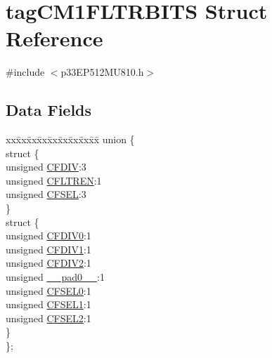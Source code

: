 \hypertarget{structtag_c_m1_f_l_t_r_b_i_t_s}{}\section{tag\+C\+M1\+F\+L\+T\+R\+B\+I\+TS Struct Reference}
\label{structtag_c_m1_f_l_t_r_b_i_t_s}


{\ttfamily \#include $<$p33\+E\+P512\+M\+U810.\+h$>$}

\subsection*{Data Fields}
\begin{DoxyCompactItemize}
\item 
\begin{tabbing}
xx\=xx\=xx\=xx\=xx\=xx\=xx\=xx\=xx\=\kill
union \{\\
\>struct \{\\
\>\>unsigned \hyperlink{structtag_c_m1_f_l_t_r_b_i_t_s_a893ad85a5c5ff41a31026a67aabcb96d}{CFDIV}:3\\
\>\>unsigned \hyperlink{structtag_c_m1_f_l_t_r_b_i_t_s_a85ad433261457df9a932a90af5069ab8}{CFLTREN}:1\\
\>\>unsigned \hyperlink{structtag_c_m1_f_l_t_r_b_i_t_s_a99780df15940d1bf27ba93d175f5f80b}{CFSEL}:3\\
\>\} \\
\>struct \{\\
\>\>unsigned \hyperlink{structtag_c_m1_f_l_t_r_b_i_t_s_a801d936cb077eadf1231d520cd686dec}{CFDIV0}:1\\
\>\>unsigned \hyperlink{structtag_c_m1_f_l_t_r_b_i_t_s_a53ee480be3ec69aea8d88e45a1fde39a}{CFDIV1}:1\\
\>\>unsigned \hyperlink{structtag_c_m1_f_l_t_r_b_i_t_s_abd46218cfab17e4af53137815971f148}{CFDIV2}:1\\
\>\>unsigned \hyperlink{structtag_c_m1_f_l_t_r_b_i_t_s_adf71f3d8410c1f1dbbc96680a92c49af}{\_\_pad0\_\_}:1\\
\>\>unsigned \hyperlink{structtag_c_m1_f_l_t_r_b_i_t_s_a20d8c88694244bc63a0138ecea229c33}{CFSEL0}:1\\
\>\>unsigned \hyperlink{structtag_c_m1_f_l_t_r_b_i_t_s_ab3beae446242496efe6f3b65b42f32f4}{CFSEL1}:1\\
\>\>unsigned \hyperlink{structtag_c_m1_f_l_t_r_b_i_t_s_a136e38e2a181ec59b7952e0a8e019fc4}{CFSEL2}:1\\
\>\} \\
\}; \\

\end{tabbing}\end{DoxyCompactItemize}


